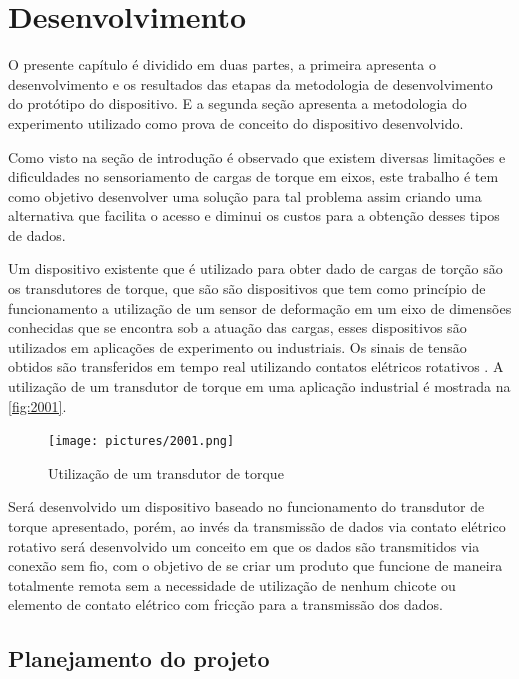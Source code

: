 

\chapter{Desenvolvimento}

O presente capítulo é dividido em duas partes, a primeira apresenta o desenvolvimento e os resultados das etapas da metodologia de desenvolvimento do protótipo do dispositivo.
E a segunda seção apresenta a metodologia do experimento utilizado como prova de conceito do dispositivo desenvolvido.

Como visto na seção de introdução é observado que existem diversas limitações e dificuldades no sensoriamento de cargas de torque em eixos, este trabalho é tem como objetivo
desenvolver uma solução para tal problema assim criando uma alternativa que facilita o acesso e diminui os custos para a obtenção desses tipos de dados.

Um dispositivo existente que é utilizado para obter dado de cargas de torção são os transdutores de torque, que são são dispositivos que tem como princípio de funcionamento
a utilização de um sensor de deformação em um eixo de dimensões conhecidas que se encontra sob a atuação das cargas, esses dispositivos são utilizados em aplicações de experimento
ou industriais.
Os sinais de tensão obtidos são transferidos em tempo real utilizando contatos elétricos rotativos \autocite{Kyowa}.
A utilização de um transdutor de torque em uma aplicação industrial é mostrada na \autoref{fig:2001}.

\begin{figure}[htb]
	\caption{\label{fig:2001} Utilização de um transdutor de torque}
	\begin{center}
		\texttt{[image: pictures/2001.png]}
	\end{center}
\end{figure}

Será desenvolvido um dispositivo baseado no funcionamento do transdutor de torque apresentado, porém, ao invés da transmissão de dados via contato elétrico rotativo será
desenvolvido um conceito em que os dados são transmitidos via conexão sem fio, com o objetivo de se criar um produto que funcione de maneira totalmente remota sem a necessidade
de utilização de nenhum chicote ou elemento de contato elétrico com fricção para a transmissão dos dados.

\section{Planejamento do projeto}


